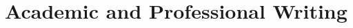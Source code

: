 \documentclass[
    12pt,
    a4paper,
    oneside,
    openany
]{book}
\begin{document}

\part{Academic and Professional Writing}



\end{document}
